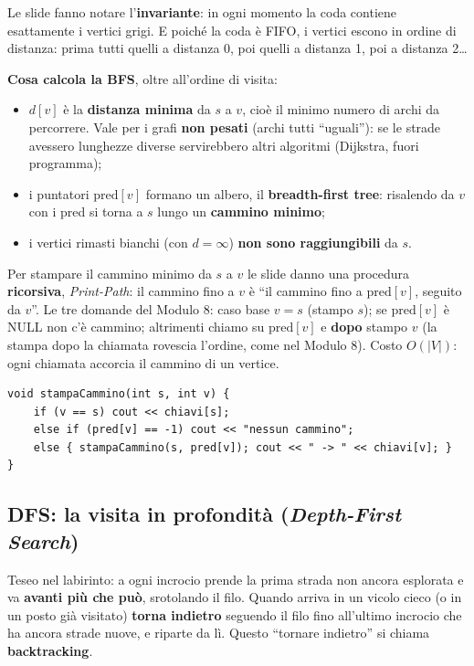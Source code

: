 Le slide fanno notare l'\textbf{invariante}: in ogni momento la coda contiene esattamente
i vertici grigi. E poiché la coda è FIFO, i vertici escono in ordine di distanza: prima
tutti quelli a distanza 0, poi quelli a distanza 1, poi a distanza 2\ldots

\textbf{Cosa calcola la BFS}, oltre all'ordine di visita:
\begin{itemize}
  \item $d[v]$ è la \textbf{distanza minima} da $s$ a $v$, cioè il minimo numero di archi
        da percorrere. Vale per i grafi \textbf{non pesati} (archi tutti ``uguali''): se le
        strade avessero lunghezze diverse servirebbero altri algoritmi (Dijkstra, fuori
        programma);
  \item i puntatori $\text{pred}[v]$ formano un albero, il \textbf{breadth-first tree}:
        risalendo da $v$ con i pred si torna a $s$ lungo un \textbf{cammino minimo};
  \item i vertici rimasti bianchi (con $d = \infty$) \textbf{non sono raggiungibili} da $s$.
\end{itemize}

Per stampare il cammino minimo da $s$ a $v$ le slide danno una procedura
\textbf{ricorsiva}, \emph{Print-Path}: il cammino fino a $v$ è ``il cammino fino a
$\text{pred}[v]$, seguito da $v$''. Le tre domande del Modulo 8: caso base $v = s$
(stampo $s$); se $\text{pred}[v]$ è NULL non c'è cammino; altrimenti chiamo su
$\text{pred}[v]$ e \textbf{dopo} stampo $v$ (la stampa dopo la chiamata rovescia l'ordine,
come nel Modulo 8). Costo $O(|V|)$: ogni chiamata accorcia il cammino di un vertice.
\begin{lstlisting}
void stampaCammino(int s, int v) {
    if (v == s) cout << chiavi[s];
    else if (pred[v] == -1) cout << "nessun cammino";
    else { stampaCammino(s, pred[v]); cout << " -> " << chiavi[v]; }
}
\end{lstlisting}

\subsection*{DFS: la visita in profondità (\emph{Depth-First Search})}

\begin{analogia}
Teseo nel labirinto: a ogni incrocio prende la prima strada non ancora esplorata e va
\textbf{avanti più che può}, srotolando il filo. Quando arriva in un vicolo cieco (o in
un posto già visitato) \textbf{torna indietro} seguendo il filo fino all'ultimo incrocio
che ha ancora strade nuove, e riparte da lì. Questo ``tornare indietro'' si chiama
\textbf{backtracking}.
\end{analogia}

